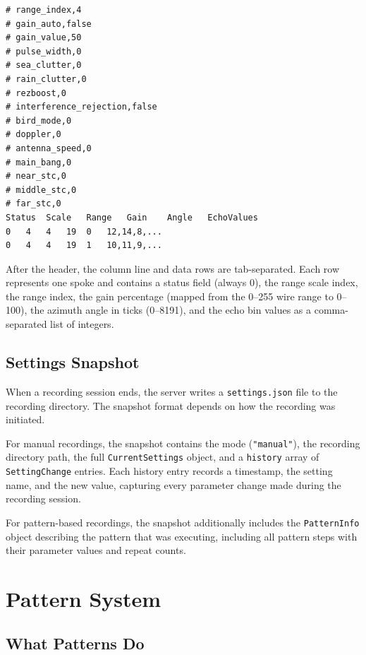 \documentclass[11pt,letterpaper]{article}
\begin{document}
\begin{lstlisting}
# range_index,4
# gain_auto,false
# gain_value,50
# pulse_width,0
# sea_clutter,0
# rain_clutter,0
# rezboost,0
# interference_rejection,false
# bird_mode,0
# doppler,0
# antenna_speed,0
# main_bang,0
# near_stc,0
# middle_stc,0
# far_stc,0
Status	Scale	Range	Gain	Angle	EchoValues
0	4	4	19	0	12,14,8,...
0	4	4	19	1	10,11,9,...
\end{lstlisting}

After the header, the column line and data rows are tab-separated. Each row represents one spoke and contains a status field (always 0), the range scale index, the range index, the gain percentage (mapped from the 0--255 wire range to 0--100), the azimuth angle in ticks (0--8191), and the echo bin values as a comma-separated list of integers.

\subsection{Settings Snapshot}
\label{subsec:settings-snapshot}

When a recording session ends, the server writes a \texttt{settings.json} file to the recording directory. The snapshot format depends on how the recording was initiated.

For manual recordings, the snapshot contains the mode (\texttt{"manual"}), the recording directory path, the full \texttt{CurrentSettings} object, and a \texttt{history} array of \texttt{SettingChange} entries. Each history entry records a timestamp, the setting name, and the new value, capturing every parameter change made during the recording session.

For pattern-based recordings, the snapshot additionally includes the \texttt{PatternInfo} object describing the pattern that was executing, including all pattern steps with their parameter values and repeat counts.


\newpage
\section{Pattern System}
\label{sec:pattern-system}

\subsection{What Patterns Do}
\label{subsec:pattern-overview}
\end{document}
